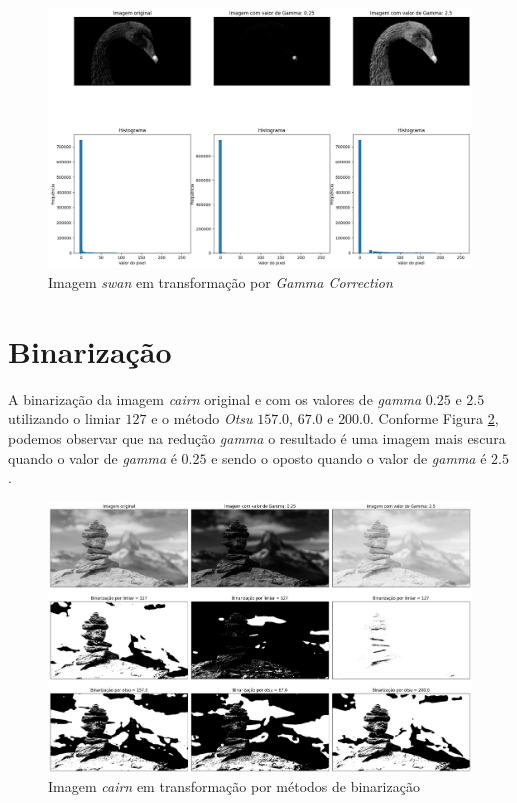 \begin{figure}
    \includegraphics[width=1\linewidth]{Elementos/Figuras/resultados-gamma-swam.png}
    \caption{Imagem \textit{swan} em transformação por \textit{Gamma Correction}}
    \label{fig:gamma-swan}
\end{figure}


\section{Binarização}

A binarização da imagem \textit{cairn} original e com os valores de \textit{gamma} $0.25$ e $2.5$ utilizando o limiar $127$ e o método \textit{Otsu} $157.0$, $67.0$ e $200.0$.
Conforme Figura \ref{fig:binarizacao-cairn}, podemos observar que na redução \textit{gamma} o resultado é uma imagem mais escura quando o valor de \textit{gamma} é $0.25$ e sendo o oposto quando o valor de \textit{gamma} é $2.5$.

\begin{figure}[h!]
    \includegraphics[width=1\linewidth]{Elementos/Figuras/resultados-binarizacao-cairn.png}
    \caption{Imagem \textit{cairn} em transformação por métodos de binarização}
    \label{fig:binarizacao-cairn}
\end{figure}

